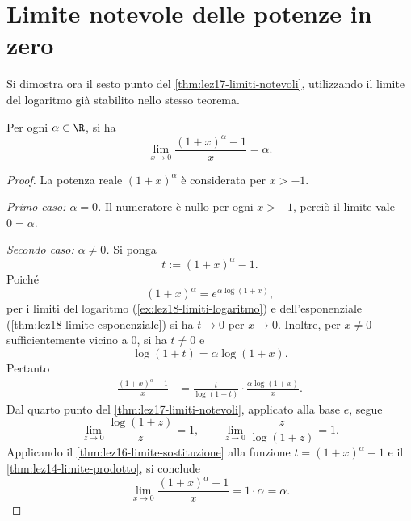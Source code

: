 \section{Limite notevole delle potenze in zero}
\label{sec:lez19-limite-potenze}

Si dimostra ora il sesto punto del
\cref{thm:lez17-limiti-notevoli}, utilizzando
il limite del logaritmo già stabilito nello stesso teorema.

\begin{proposition}
\label{prop:lez19-limite-potenze}
Per ogni \(\alpha\in\R\), si ha
\[
  \lim_{x\to0}\frac{(1+x)^\alpha-1}{x}=\alpha.
\]
\end{proposition}

\begin{proof}
La potenza reale \((1+x)^\alpha\) è considerata
per \(x>-1\).

\emph{Primo caso: \(\alpha=0\).}
Il numeratore è nullo per ogni \(x>-1\),
perciò il limite vale \(0=\alpha\).

\emph{Secondo caso: \(\alpha\ne0\).}
Si ponga
\[
  t:=(1+x)^\alpha-1.
\]
Poiché
\[
  (1+x)^\alpha=e^{\alpha\log(1+x)},
\]
per i limiti del logaritmo
(\cref{ex:lez18-limiti-logaritmo})
e dell'esponenziale (\cref{thm:lez18-limite-esponenziale})
si ha \(t\to0\) per \(x\to0\).
Inoltre, per \(x\ne0\) sufficientemente vicino a \(0\),
si ha \(t\ne0\) e
\[
  \log(1+t)=\alpha\log(1+x).
\]
Pertanto
\[
\begin{aligned}
  \frac{(1+x)^\alpha-1}{x}
  &=\frac{t}{\log(1+t)}
    \cdot\frac{\alpha\log(1+x)}{x}.
\end{aligned}
\]
Dal quarto punto del \cref{thm:lez17-limiti-notevoli},
applicato alla base \(e\), segue
\[
  \lim_{z\to0}\frac{\log(1+z)}z=1,
  \qquad
  \lim_{z\to0}\frac{z}{\log(1+z)}=1.
\]
Applicando il \cref{thm:lez16-limite-sostituzione}
alla funzione \(t=(1+x)^\alpha-1\) e il
\cref{thm:lez14-limite-prodotto}, si conclude
\[
  \lim_{x\to0}\frac{(1+x)^\alpha-1}{x}
  =1\cdot\alpha=\alpha.
\]
\end{proof}
